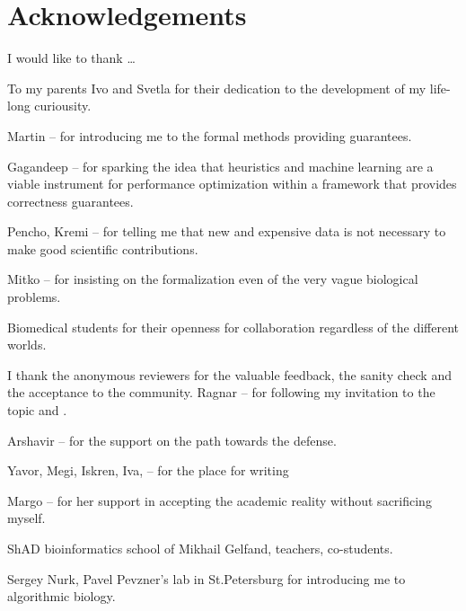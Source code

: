 
\bigskip

\begingroup
\let\clearpage\relax
\let\cleardoublepage\relax
\let\cleardoublepage\relax
\chapter*{Acknowledgements}

\def\thanks#1{%
\begingroup
\leftskip1em
\noindent #1
\par
\endgroup
}

I would like to thank \dots

To my parents Ivo and Svetla for their dedication to the development of my
life-long curiousity.

Martin -- for introducing me to the formal methods providing guarantees.

Gagandeep -- for sparking the idea that heuristics and machine learning are a
viable instrument for performance optimization within a framework that provides
correctness guarantees.

Pencho, Kremi -- for telling me that new and expensive data is not necessary to make
good scientific contributions.

Mitko -- for insisting on the formalization even of the very vague biological
problems.

Biomedical students for their openness for collaboration regardless of the
different worlds.

I thank the anonymous reviewers for the valuable feedback, the sanity check and
the acceptance to the community. 
Ragnar -- for following my invitation to the topic and .

Arshavir -- for the support on the path towards the defense.

Yavor, Megi, Iskren, Iva, -- for the place for writing

Margo -- for her support in accepting the academic reality without sacrificing myself.

ShAD bioinformatics school of Mikhail Gelfand, teachers, co-students.

Sergey Nurk, Pavel Pevzner's lab in St.Petersburg for introducing me to
algorithmic biology.

